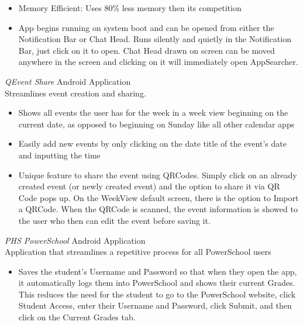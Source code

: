 \documentclass[line,margin]{res}
\begin{document}
\begin{resume}
                 \begin{itemize}  \itemsep -2pt 
                 \item Memory Efficient: Uses 80\% less memory then its competition
                 \end{itemize}
                 
                 \begin{itemize}  \itemsep -2pt 
                 \item App begins running on system boot and can be opened from either the Notification Bar or Chat Head. Runs silently and quietly in the Notification Bar, just click on it to open. Chat Head drawn on screen can be moved anywhere in the screen and clicking on it will immediately open AppSearcher.
                 \end{itemize}
                {\sl QEvent Share} \hfill Android Application\\
                Streamlines event creation and sharing.
                  \begin{itemize} \itemsep -2pt 
                   \item Shows all events the user has for the week in a week view beginning on the current date, as opposed to beginning on Sunday like all other calendar apps
                   \end{itemize} 
                   
                   \begin{itemize} \itemsep -2pt 
                   \item Easily add new events by only clicking on the date title of the event's date and inputting the time
                   \end{itemize}
                   
                   \begin{itemize} \itemsep -2pt 
                   \item Unique feature to share the event using QRCodes. Simply click on an already created event (or newly created event) and the option to share it via QR Code pops up. On the WeekView default screen, there is the option to Import a QRCode. When the QRCode is scanned, the event information is showed to the user who then can edit the event before saving it.
                   \end{itemize}
                   
                   {\sl PHS PowerSchool} \hfill Android Application \\
                   Application that streamlines a repetitive process for all PowerSchool users
                   \begin{itemize} \itemsep -2pt
                   \item 
                   Saves the student's Username and Password so that when they open the app, it automatically logs them into PowerSchool and shows their current Grades. This reduces the need for the student to go to the PowerSchool website, click Student Access, enter their Username and Password, click Submit, and then click on the Current Grades tab.
                   \end{itemize}
                   

\end{resume}
\end{document}
